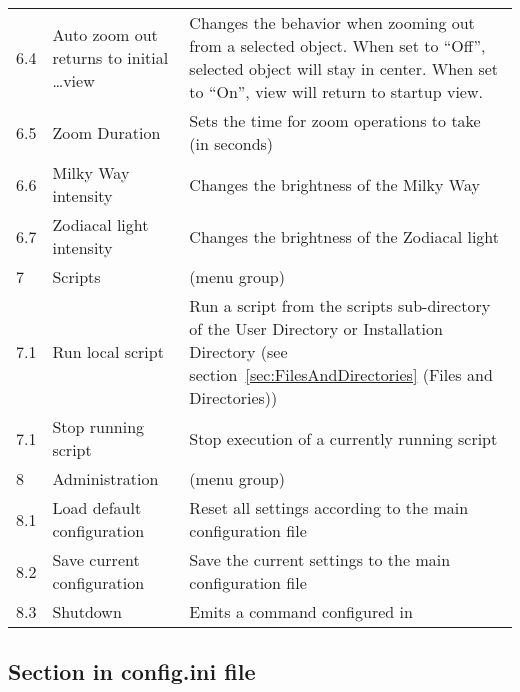 \begin{longtable}{l|p{45mm}|p{85mm}}
6.4  & Auto zoom out returns to initial \ldots view & Changes the behavior when zooming out from a selected object.
                                                      When set to ``Off'', selected object will stay in center.
                                                      When set to ``On'', view will return to startup view. \\%
6.5  & Zoom Duration              & Sets the time for zoom operations to take (in seconds)\\%
6.6  & Milky Way intensity        & Changes the brightness of the Milky Way\\%
6.7  & Zodiacal light intensity   & Changes the brightness of the Zodiacal light\\\midrule
7    & Scripts                    & (menu group)\\%
7.1  & Run local script           & Run a script from the scripts sub-directory of the User Directory or Installation Directory 
                                   (see section~\ref{sec:FilesAndDirectories} (Files and Directories))\\%
7.1  & Stop running script        & Stop execution of a currently running script \\\midrule
8    & Administration             & (menu group)\\%
8.1  & Load default configuration & Reset all settings according to the main configuration file\\%
8.2  & Save current configuration & Save the current settings to the main configuration file\\%
8.3  & Shutdown                   & Emits a command configured in \\\midrule
\end{longtable}


\subsection{Section  in config.ini file}

